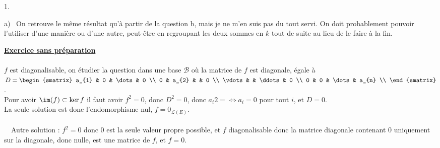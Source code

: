 \documentclass[11pt]{article}%
\begin{document}
\begin{exercice}
\begin{noliste}{1.}
\begin{noliste}{a)}
\
 On retrouve le même résultat qu'à partir de la question b, mais je ne
m'en suis pas du tout servi. On doit probablement pouvoir l'utiliser
d'une manière ou d'une autre, peut-être en regroupant les deux sommes
en $k$ tout de suite au lieu de le faire à la fin. \\
 \end{noliste}
 \end{noliste}
 \noindent \textbf{\underline{Exercice sans préparation}} \\
\\
 $f$ est diagonalisable, on étudier la question dans une base
$\mathcal{B}$ où la matrice de $f$ est diagonale, égale à $D =
\begin{smatrix}
a_{1} & 0 & \dots & 0 \\
0 & a_{2} & & 0 \\
\vdots & & \ddots & 0 \\
0 & 0 & \dots & a_{n} \\
\end{smatrix}
$. \\
Pour avoir $\im(f) \subset \ker f$ il faut avoir $f^{2} = 0$, donc
$D^{2} = 0$, donc $a_{i}{2} = \Leftrightarrow a_{i} = 0$ pour tout
$i$,
et $D = 0$. \\
La seule solution est donc l'endomorphisme nul, $f = 0_{\mathcal{L}
  (E)}$. \\
\\\
\ Autre solution : $f^{2} = 0$ donc 0 est la seule valeur propre
possible, et $f$ diagonalisable donc la matrice diagonale contenant 0
uniquement sur la diagonale, donc nulle, est une matrice de $f$, et $f
= 0$.
 \end{exercice}

 \newpage
\end{document}

